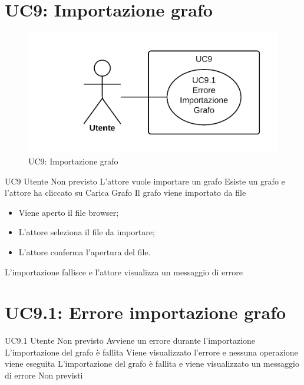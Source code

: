 \documentclass[../AnalisideiRequisiti.tex]{subfiles}
\begin{document}
\section{UC9: Importazione grafo}
\begin{figure}[H]
	\centering
	\includegraphics[width=\textwidth]{../img/UC9.png}
	\caption{UC9: Importazione grafo}
\end{figure}
\UserCase
{UC9}
{Utente}
{Non previsto}
{L'attore vuole importare un grafo}
{Esiste un grafo e l'attore ha cliccato su Carica Grafo}
{Il grafo viene importato da file}
{
	\begin{itemize}
			\item{} Viene aperto il file browser;
			\item{} L'attore seleziona il file da importare;
			\item{} L'attore conferma l'apertura del file.
	\end{itemize}
}
{L'importazione fallisce e l'attore visualizza un messaggio di errore }

\section{UC9.1: Errore importazione grafo}
\UserCase
{UC9.1}
{Utente}
{Non previsto}
{Avviene un errore durante l'importazione}
{L'importazione del grafo è fallita}
{Viene visualizzato l'errore e nessuna operazione viene eseguita}
{L'importazione del grafo è fallita e viene visualizzato un messaggio di errore}
{Non previsti}
\end{document}
